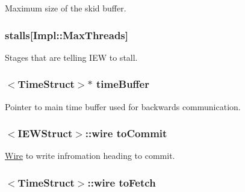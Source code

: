 Maximum size of the skid buffer. \hypertarget{classDefaultIEW_ade48cf321f5741ea8e54e071680cacdc}{
\subsubsection[{stalls}]{ {\bf stalls}\mbox{[}Impl::MaxThreads\mbox{]}}}
\label{classDefaultIEW_ade48cf321f5741ea8e54e071680cacdc}
Stages that are telling IEW to stall. \hypertarget{classDefaultIEW_a83f9ee976e732665aeb08dbc19acfd45}{
\subsubsection[{timeBuffer}]{$<${\bf TimeStruct}$>$$\ast$ {\bf timeBuffer}}}
\label{classDefaultIEW_a83f9ee976e732665aeb08dbc19acfd45}
Pointer to main time buffer used for backwards communication. \hypertarget{classDefaultIEW_aaebdc531a44267a7cc38b8bb6d3690d4}{
\subsubsection[{toCommit}]{$<${\bf IEWStruct}$>$::wire {\bf toCommit}}}
\label{classDefaultIEW_aaebdc531a44267a7cc38b8bb6d3690d4}
\hyperlink{classWire}{Wire} to write infromation heading to commit. \hypertarget{classDefaultIEW_acc94cfae2a67b5dbb0e74e81c24a3b6e}{
\subsubsection[{toFetch}]{$<${\bf TimeStruct}$>$::wire {\bf toFetch}}}
\label{classDefaultIEW_acc94cfae2a67b5dbb0e74e81c24a3b6e}
